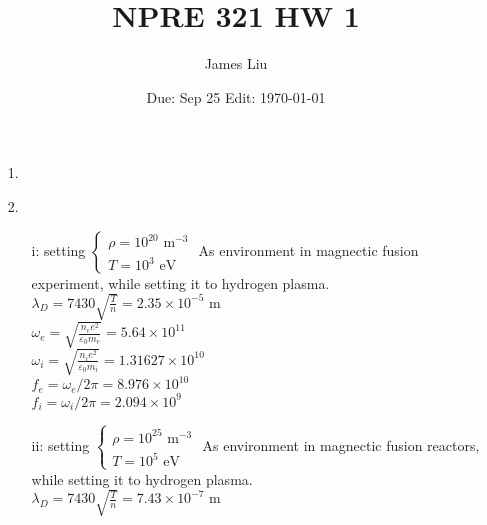 \documentclass{article}
\date{Due: Sep 25 Edit: \today}
\title{NPRE 321 HW 1}
\author{James Liu}
\begin{document}
\maketitle
\begin{itemize}
    \item [1.]
    \item [2.] 
        \begin{itemize}
            \item [i:] setting \(\left\{\begin{matrix}
                \rho = 10^{20} \text{ m}^{-3}\\
                T    = 10^3 \text{ eV}
            \end{matrix}\right.\) As environment in magnectic fusion experiment, while setting it to hydrogen plasma.\\
            \(\lambda_D = 7430\sqrt{\frac{T}{n}} = 2.35 \times 10^{-5} \text{ m}\)\\
            \(\omega_e = \sqrt{\frac{n_ee^2}{\varepsilon_0m_e}} = 5.64\times 10^{11}\)\\
            \(\omega_i = \sqrt{\frac{n_ie^2}{\varepsilon_0m_i}} = 1.31627\times 10^{10}\)\\
            \(f_e  =\omega_e /2\pi = 8.976\times 10^{10}\)\\
            \(f_i  =\omega_i /2\pi = 2.094\times 10^{9}\)
            \item [ii:] setting \(\left\{\begin{matrix}
                \rho = 10^{25} \text{ m}^{-3}\\
                T    = 10^5 \text{ eV}
            \end{matrix}\right.\) As environment in magnectic fusion reactors, while setting it to hydrogen plasma.\\
            \(\lambda_D = 7430\sqrt{\frac{T}{n}} = 7.43 \times 10^{-7} \text{ m}\)\\

\end{itemize}
\end{itemize}
\end{document}
